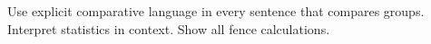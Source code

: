 \documentclass[10pt]{article}
\begin{document}

\vspace{0.10in}

\begin{tcolorbox}[colback=sky, colframe=navy, boxrule=0.8pt, arc=2mm,
    left=3mm, right=3mm, top=1.5mm, bottom=1.5mm]
\small Use explicit comparative language in every sentence that compares groups.
Interpret statistics in context. Show all fence calculations.
\end{tcolorbox}

\vspace{0.12in}

\boxguard
\end{document}
